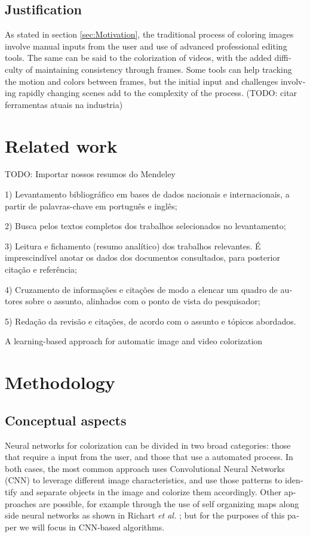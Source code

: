 \documentclass[12pt,openright,twoside,a4paper,english]{abntex2}
\begin{document}
\begin{otherlanguage}{english}
\section{Justification}
As stated in section \ref{sec:Motivation}, the traditional process of coloring images involve manual inputs from the user and use of advanced professional editing tools.
The same can be said to the colorization of videos, with the added difficulty of maintaining consistency through frames. Some tools can help tracking the motion and colors between frames, but the initial input and challenges involving rapidly changing scenes add to the complexity of the process. (TODO: citar ferramentas atuais na industria)

\chapter{Related work}

TODO: Importar nossos resumos do Mendeley

1) Levantamento bibliográfico em bases de dados nacionais e internacionais, a
partir de palavras-chave em português e inglês;

2) Busca pelos textos completos dos trabalhos selecionados no levantamento;

3) Leitura e fichamento (resumo analítico) dos trabalhos relevantes. É imprescindível anotar os dados dos documentos consultados, para posterior citação e referência;

4) Cruzamento de informações e citações de modo a elencar um quadro de autores sobre o assunto, alinhados com o ponto de vista do pesquisador;

5) Redação da revisão e citações, de acordo com o assunto e tópicos abordados.

A learning-based approach for automatic image and video colorization

\chapter{Methodology}
\section{Conceptual aspects} \label{sec:Concept}
Neural networks for colorization can be divided in two broad categories: those that require a input from the user, and those that use a automated process. In both cases, the most common approach uses Convolutional Neural Networks (CNN) to leverage different image characteristics, and use those patterns to identify and separate objects in the image and colorize them accordingly. Other approaches are possible, for example through the use of self organizing maps along side neural networks as shown in Richart \textit{et al.} \cite{Richart_som_nn}; but for the purposes of this paper we will focus in CNN-based algorithms.


\end{otherlanguage}
\end{document}
